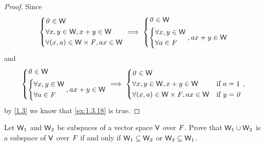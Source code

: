 \begin{proof}
	Since
	\[
		\begin{dcases}
			\mathit{0} \in \mathsf{W}                        \\
			\forall x, y \in \mathsf{W}, x + y \in \mathsf{W} \\
			\forall (x, a) \in \mathsf{W} \times \mathit{F}, ax \in \mathsf{W}
		\end{dcases} \implies \begin{dcases}
			\mathit{0} \in \mathsf{W} \\
			\begin{dcases}
				\forall x, y \in \mathsf{W} \\
				\forall a \in \mathit{F}
			\end{dcases}, ax + y \in \mathsf{W}
		\end{dcases}
	\]
	and
	\[
		\begin{dcases}
			\mathit{0} \in \mathsf{W} \\
			\begin{dcases}
				\forall x, y \in \mathsf{W} \\
				\forall a \in \mathit{F}
			\end{dcases}, ax + y \in \mathsf{W}
		\end{dcases} \implies \begin{dcases}
			\mathit{0} \in \mathsf{W}                                                      \\
			\forall x, y \in \mathsf{W}, x + y \in \mathsf{W}          & \text{if } a = 1   \\
			\forall (x, a) \in \mathsf{W} \times \mathit{F}, ax \in \mathsf{W} & \text{if } y = \mathit{0}
		\end{dcases},
	\]
	by \cref{1.3} we know that \cref{ex:1.3.18} is true.
\end{proof}

\begin{ex}\label{ex:1.3.19}
	Let \(\mathsf{W}_1\) and \(\mathsf{W}_2\) be subspaces of a vector space \(\mathsf{V}\) over \(\mathit{F}\).
	Prove that \(\mathsf{W}_1 \cup \mathsf{W}_2\) is a subspace of \(\mathsf{V}\) over \(\mathit{F}\) if and only if \(\mathsf{W}_1 \subseteq \mathsf{W}_2\) or \(\mathsf{W}_2 \subseteq \mathsf{W}_1\).
\end{ex}

